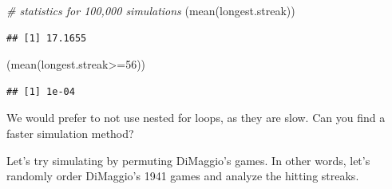 \documentclass[
  11pt,
]{book}
\newenvironment{Shaded}{\begin{snugshade}}{\end{snugshade}}
\newcommand{\CommentTok}[1]{\textcolor[rgb]{0.56,0.35,0.01}{\textit{#1}}}
\newcommand{\DecValTok}[1]{\textcolor[rgb]{0.00,0.00,0.81}{#1}}
\newcommand{\FunctionTok}[1]{\textcolor[rgb]{0.00,0.00,0.00}{#1}}
\newcommand{\NormalTok}[1]{#1}
\newcommand{\SpecialCharTok}[1]{\textcolor[rgb]{0.00,0.00,0.00}{#1}}
\theoremstyle{definition}
\theoremstyle{definition}
\theoremstyle{definition}
\theoremstyle{definition}
\theoremstyle{remark}
\begin{document}
\begin{Shaded}
\begin{Highlighting}[]
\CommentTok{\# statistics for 100,000 simulations}
\NormalTok{(}\FunctionTok{mean}\NormalTok{(longest.streak))}
\end{Highlighting}
\end{Shaded}

\begin{verbatim}
## [1] 17.1655
\end{verbatim}

\begin{Shaded}
\begin{Highlighting}[]
\NormalTok{(}\FunctionTok{mean}\NormalTok{(longest.streak}\SpecialCharTok{\textgreater{}=}\DecValTok{56}\NormalTok{))}
\end{Highlighting}
\end{Shaded}

\begin{verbatim}
## [1] 1e-04
\end{verbatim}

We would prefer to not use nested for loops, as they are slow. Can you find a faster simulation method?

Let's try simulating by permuting DiMaggio's games. In other words, let's randomly order DiMaggio's 1941 games and analyze the hitting streaks.
\end{document}
